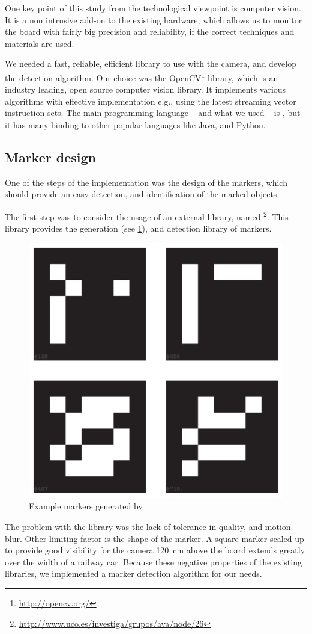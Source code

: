 One key point of this study from the technological viewpoint is computer vision. It is a non intrusive add-on to the existing hardware, which allows us to monitor the board with fairly big precision and reliability, if the correct techniques and materials are used.

We needed a fast, reliable, efficient library to use with the camera, and develop the detection algorithm. Our choice was the OpenCV\footnote{\url{http://opencv.org/}} library, which is an industry leading, open source computer vision library. It implements various algorithms with effective implementation e.g., using the latest streaming vector instruction sets. The main programming language -- and what we used -- is , but it has many binding to other popular languages like Java, and Python.

\subsection{Marker design}

One of the steps of the  implementation was the design of the markers, which should provide an easy detection, and identification of the marked objects.

The first step was to consider the usage of an external library, named \footnote{\url{http://www.uco.es/investiga/grupos/ava/node/26}}. This library provides the generation (see \cref{fig:case_study:aruco_markers}), and detection library of markers.

\begin{figure}[h]
	\centering
	\includegraphics[width=0.35\linewidth]{include/figures/chapter_6/opencv_2}
	\caption{Example markers generated by }
	\label{fig:case_study:aruco_markers}
\end{figure}

The problem with the library was the lack of tolerance in quality, and motion blur. Other limiting factor is the shape of the marker. A square marker scaled up to provide good visibility for the camera 120~\si{\centi\meter} above the board extends greatly over the width of a railway car. Because these negative properties of the existing libraries, we implemented a marker detection algorithm for our needs.

